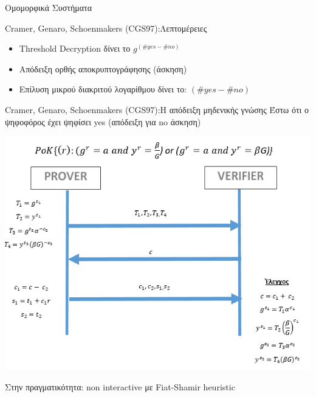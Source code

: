 \documentclass[handout]{beamer}
\begin{document}
\begin{section}{Ομομορφικά Συστήματα}
\begin{frame}{Cramer, Genaro, Schoenmakers (CGS97):Λεπτομέρειες}
\begin{itemize}
\begin{itemize}
            \item Threshold Decryption δίνει το $g^{(\#yes-\#no)}$
            \item Απόδειξη ορθής αποκρυπτογράφησης (άσκηση)
            \item Επίλυση μικρού διακριτού λογαρίθμου δίνει το:  $(\#yes-\#no)$
        \end{itemize}
    \end{itemize}
\end{frame}


\begin{frame}{Cramer, Genaro, Schoenmakers (CGS97):Η απόδειξη μηδενικής γνώσης}
    Έστω ότι ο ψηφοφόρος έχει ψηφίσει yes (απόδειξη για no άσκηση)
    \begin{center}
        \includegraphics[scale=0.35]{cgs97.PNG}
    \end{center}
    Στην πραγματικότητα: non interactive με Fiat-Shamir heuristic
\end{frame}

\end{section} 
\end{document}
